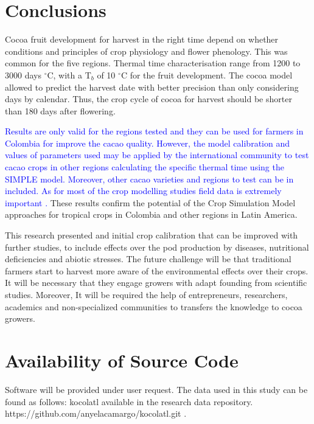 \documentclass[gene,journal,article,submit,moreauthors,pdftex]{Definitions/mdpi}
\begin{document}
\section{Conclusions}

Cocoa fruit development for harvest in the right time depend on whether conditions and principles of crop physiology and flower phenology.  This was common for the five regions. Thermal time characterisation range from 1200 to 3000 days $^\circ$C, with a T$_{b}$ of 10 $^\circ$C for the fruit development.  The cocoa model allowed to predict the harvest date with better precision than only considering days by calendar. Thus, the crop cycle of cocoa for harvest  should be shorter than 180 days after flowering. 

\textcolor{blue}{Results are only valid for the regions tested and they can be used for farmers in Colombia for improve the cacao quality.  However, the model calibration and values of parameters used may be applied by the international community to test cacao crops in other regions calculating the specific thermal time using the SIMPLE model. Moreover, other cacao varieties and regions to test can be in included. As for most of the crop modelling studies field data is extremely important .} These results confirm the potential of the Crop Simulation Model approaches  for tropical crops in Colombia and other regions in Latin America.

This research presented and initial crop calibration that can be improved with further studies, to include effects over the pod production by diseases, nutritional deficiencies and abiotic stresses. The future challenge will be that traditional farmers start to harvest more aware of the environmental effects over their crops. It will be necessary that they engage growers with adapt founding from scientific studies. Moreover, It will be required the help of entrepreneurs, researchers, academics and non-specialized communities to transfers the knowledge to cocoa growers.

\section{Availability of Source Code}
Software will be provided under user request. The data used in this study can be found as follows: kocolatl available in the  research data repository.\\ https://github.com/anyelacamargo/kocolatl.git .
\end{document}
